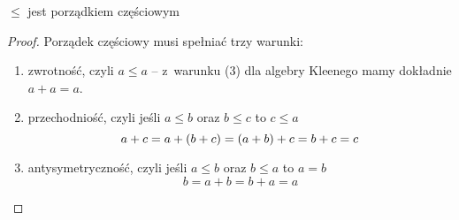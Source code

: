 \begin{lemma}
	\(\leq\) jest porządkiem częściowym
\end{lemma}
\begin{proof} Porządek częściowy musi spełniać trzy warunki:
	\begin{enumerate}
		\item zwrotność, czyli \( a \leq a \) -- z~warunku (3) dla algebry Kleenego mamy dokładnie \(a + a = a\).
		\item przechodniość, czyli jeśli \(a \leq b\) oraz \(b \leq c\) to \(c \leq a\)
		      \begin{equation*}
			      a + c = a + \left(b + c\right) = \left(a + b\right) + c = b + c = c
		      \end{equation*}
		\item antysymetryczność, czyli jeśli \(a \leq b\) oraz \(b \leq a\) to \(a = b \)
		      \begin{equation*}
			      b = a + b = b + a = a
		      \end{equation*}
	\end{enumerate}
\end{proof}